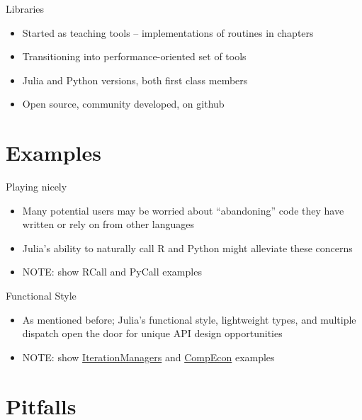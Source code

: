 \documentclass[compress,10pt]{beamer}
\begin{document}
\begin{frame}{Libraries}

\begin{itemize}
\itemsep1pt\parskip0pt
\item
  Started as teaching tools -- implementations of routines in chapters
\item
  Transitioning into performance-oriented set of tools
\item
  Julia and Python versions, both first class members
\item
  Open source, community developed, on github
\end{itemize}

\end{frame}

\section{Examples}\label{examples}

\begin{frame}{Playing nicely}

\begin{itemize}
\itemsep1pt\parskip0pt
\item
  Many potential users may be worried about ``abandoning'' code they
  have written or rely on from other languages
\item
  Julia's ability to naturally call R and Python might alleviate these
  concerns
\item
  NOTE: show RCall and PyCall examples
\end{itemize}

\end{frame}

\begin{frame}{Functional Style}

\begin{itemize}
\itemsep1pt\parskip0pt
\item
  As mentioned before; Julia's functional style, lightweight types, and
  multiple dispatch open the door for unique API design opportunities
\item
  NOTE: show
  \href{https://github.com/spencerlyon2/IterationManagers.jl}{IterationManagers}
  and \href{https://github.com/spencerlyon2/CompEcon.jl}{CompEcon}
  examples
\end{itemize}

\end{frame}

\section{Pitfalls}\label{pitfalls}
\end{document}
